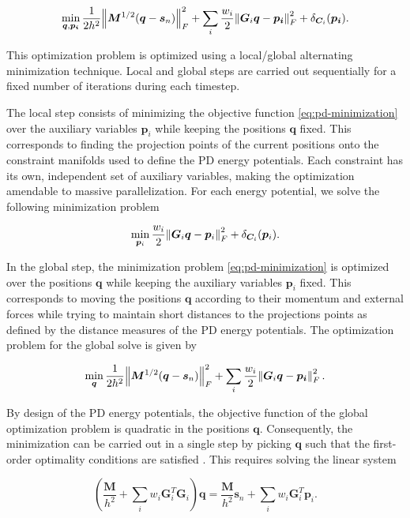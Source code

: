 \begin{equation}\label{eq:pd-minimization}
    \min_{\bm{q}, \bm{p_i}} \frac{1}{2h^2} \norm{\bm{M}^{1/2}(\bm{q} - \bm{s}_n)}^2_F + \sum_i \frac{w_i}{2} \norm{\bm{G}_i\bm{q}
    - \bm{p_i}}^2_F + \delta_{\bm{C}_i}(\bm{p_i}).
\end{equation}

\noindent This optimization problem is optimized using a local/global alternating minimization technique. Local and global steps 
are carried out sequentially for a fixed number of iterations during each timestep. 

The local step consists of minimizing the objective function \cref{eq:pd-minimization} over 
the auxiliary variables $\bm{p}_i$ while keeping the positions $\bm{q}$ fixed. This corresponds to finding the projection points of 
the current positions onto the constraint manifolds used to define the PD energy potentials. Each constraint has its own, independent 
set of auxiliary variables, making the optimization amendable to massive parallelization. For each energy potential, we solve the 
following minimization problem

\[
    \min_{\bm{p}_i} \frac{w_i}{2}\norm{\bm{G}_i\bm{q} - \bm{p}_i}^2_F + \delta_{\bm{C}_i}(\bm{p}_i).
\]

In the global step, the minimization problem \cref{eq:pd-minimization} is optimized over the positions $\bm{q}$ while keeping the auxiliary 
variables $\bm{p}_i$ fixed.
This corresponds to moving the positions $\bm{q}$ according to their momentum and external forces while trying to maintain short distances
to the projections points as defined by the distance measures of the PD energy potentials. The optimization problem for the global solve is 
given by

\[
    \min_{\bm{q}} \frac{1}{2h^2} \norm{\bm{M}^{1/2}(\bm{q} - \bm{s}_n)}^2_F + \sum_i \frac{w_i}{2} \norm{\bm{G}_i\bm{q} - \bm{p_i}}^2_F.
\]

\noindent By design of the PD energy potentials, the objective function of the global optimization problem is quadratic in the positions 
$\bm{q}$. Consequently, the minimization can be carried out in a single step by picking $\bm{q}$ such that the first-order optimality 
conditions are satisfied \cite{nocedal2006}. This requires solving the linear system

\[
    (\frac{\bm{M}}{h^2} + \sum_i w_i \bm{G}_i^T \bm{G}_i)\bm{q} = \frac{\bm{M}}{h^2}\bm{s}_n + \sum_i w_i \bm{G}_i^T \bm{p}_i.
\]

